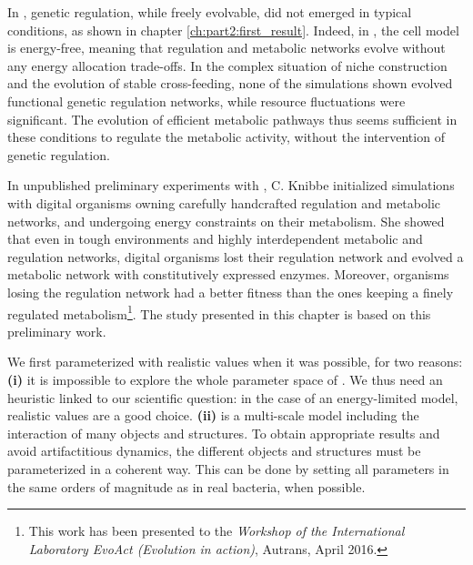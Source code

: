 In {\EvoEvoSim}, genetic regulation, while freely evolvable, did not emerged in typical conditions, as shown in chapter \ref{ch:part2:first_result}. Indeed, in \cite{rocabert-et-al-2017}, the cell model is energy-free, meaning that regulation and metabolic networks evolve without any energy allocation trade-offs. In the complex situation of niche construction and the evolution of stable cross-feeding, none of the simulations shown evolved functional genetic regulation networks, while resource fluctuations were significant. The evolution of efficient metabolic pathways thus seems sufficient in these conditions to regulate the metabolic activity, without the intervention of genetic regulation.

In unpublished preliminary experiments with {\EvoEvoSim}, C. Knibbe initialized simulations with digital organisms owning carefully handcrafted regulation and metabolic networks, and undergoing energy constraints on their metabolism. She showed that even in tough environments and highly interdependent metabolic and regulation networks, digital organisms lost their regulation network and evolved a metabolic network with constitutively expressed enzymes. Moreover, organisms losing the regulation network had a better fitness than the ones keeping a finely regulated metabolism\footnote{This work has been presented to the \textit{Workshop of the International Laboratory EvoAct (Evolution in action)}, Autrans, April 2016.}. The study presented in this chapter is based on this preliminary work.

We first parameterized {\EvoEvoSim} with realistic values when it was possible, for two reasons: \textbf{(i)} it is impossible to explore the whole parameter space of {\EvoEvoSim}. We thus need an heuristic linked to our scientific question: in the case of an energy-limited model, realistic values are a good choice. \textbf{(ii)} {\EvoEvoSim} is a multi-scale model including the interaction of many objects and structures. To obtain appropriate results and avoid artifactitious dynamics, the different objects and structures must be parameterized in a coherent way. This can be done by setting all parameters in the same orders of magnitude as in real bacteria, when possible.

